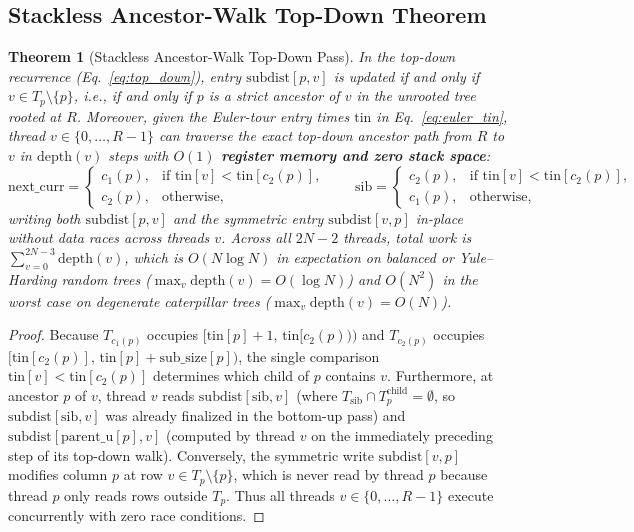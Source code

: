 \documentclass[11pt,a4paper]{article}
\newtheorem{theorem}{Theorem}[section]
\theoremstyle{definition}
\begin{document}
\subsection{Stackless Ancestor-Walk Top-Down Theorem}

\begin{theorem}[Stackless Ancestor-Walk Top-Down Pass]
\label{thm:ancestor_walk}
In the top-down recurrence (Eq.~\eqref{eq:top_down}), entry $\text{subdist}[p, v]$ is updated if and only if $v \in T_p \setminus \{p\}$, i.e., if and only if $p$ is a strict ancestor of $v$ in the unrooted tree rooted at $R$. Moreover, given the Euler-tour entry times $\text{tin}$ in Eq.~\eqref{eq:euler_tin}, thread $v \in \{0, \dots, R-1\}$ can traverse the exact top-down ancestor path from $R$ to $v$ in $\text{depth}(v)$ steps with \textbf{$O(1)$ register memory and zero stack space}:
\begin{equation}
\text{next\_curr} = \begin{cases} c_1(p), & \text{if } \text{tin}[v] < \text{tin}[c_2(p)], \\ c_2(p), & \text{otherwise}, \end{cases} \qquad
\text{sib} = \begin{cases} c_2(p), & \text{if } \text{tin}[v] < \text{tin}[c_2(p)], \\ c_1(p), & \text{otherwise}, \end{cases}
\end{equation}
writing both $\text{subdist}[p, v]$ and the symmetric entry $\text{subdist}[v, p]$ in-place without data races across threads $v$. Across all $2N-2$ threads, total work is $\sum_{v=0}^{2N-3} \text{depth}(v)$, which is $O(N \log N)$ in expectation on balanced or Yule--Harding random trees ($\max_v \text{depth}(v) = O(\log N)$) and $O(N^2)$ in the worst case on degenerate caterpillar trees ($\max_v \text{depth}(v) = O(N)$).
\end{theorem}
\begin{proof}
Because $T_{c_1(p)}$ occupies $[\text{tin}[p]+1, \, \text{tin}[c_2(p)))$ and $T_{c_2(p)}$ occupies $[\text{tin}[c_2(p)], \, \text{tin}[p]+\text{sub\_size}[p])$, the single comparison $\text{tin}[v] < \text{tin}[c_2(p)]$ determines which child of $p$ contains $v$. Furthermore, at ancestor $p$ of $v$, thread $v$ reads $\text{subdist}[\text{sib}, v]$ (where $T_{\text{sib}} \cap T_p^{\text{child}} = \emptyset$, so $\text{subdist}[\text{sib}, v]$ was already finalized in the bottom-up pass) and $\text{subdist}[\text{parent\_u}[p], v]$ (computed by thread $v$ on the immediately preceding step of its top-down walk). Conversely, the symmetric write $\text{subdist}[v, p]$ modifies column $p$ at row $v \in T_p \setminus \{p\}$, which is never read by thread $p$ because thread $p$ only reads rows outside $T_p$. Thus all threads $v \in \{0, \dots, R-1\}$ execute concurrently with zero race conditions.
\end{proof}
\end{document}
